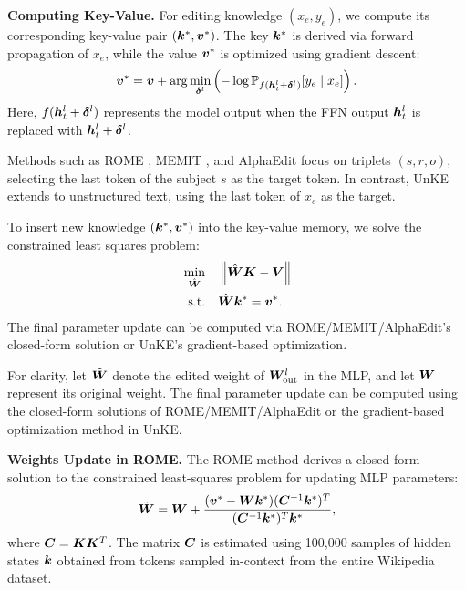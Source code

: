 \textbf{Computing Key-Value.} For editing knowledge $(x_e, y_e)$, we compute its corresponding key-value pair $({\bm{k}}^*, {\bm{v}}^*)$. The key ${\bm{k}}^*$ is derived via forward propagation of $x_e$, while the value ${\bm{v}}^*$ is optimized using gradient descent:
\begin{equation}
    {\bm{v}}^* = {\bm{v}} + \arg \min_{\bm{\delta}^l} \left( -\log \mathbb{P}_{f({\bm{h}}_t^l + \bm{\delta}^l)} [y_e \mid x_e] \right).
\end{equation}
Here, $f({\bm{h}}_t^l + \bm{\delta}^l)$ represents the model output when the FFN output ${\bm{h}}_t^l$ is replaced with ${\bm{h}}_t^l + \bm{\delta}^l$. 

Methods such as ROME \cite{ROME}, MEMIT \cite{MEMIT}, and AlphaEdit \cite{AlphaEdit} focus on triplets $(s, r, o)$, selecting the last token of the subject $s$ as the target token. In contrast, UnKE \cite{UnKE} extends to unstructured text, using the last token of $x_e$ as the target.

To insert new knowledge $({\bm{k}}^*, {\bm{v}}^*)$ into the key-value memory, we solve the constrained least squares problem:
\begin{align*}
    \min_{\hat{{\bm{W}}}} &\quad \left\lVert \hat{{\bm{W}}}{\bm{K}} - {\bm{V}} \right\rVert \\
    \text{s.t.} &\quad \hat{{\bm{W}}}{\bm{k}}^* = {\bm{v}}^*.
\end{align*}
The final parameter update can be computed via ROME/MEMIT/AlphaEdit's closed-form solution or UnKE's gradient-based optimization.

For clarity, let $\tilde{{\bm{W}}}$ denote the edited weight of ${\bm{W}}_{\text{out}}^l$ in the MLP, and let ${\bm{W}}$ represent its original weight. The final parameter update can be computed using the closed-form solutions of ROME/MEMIT/AlphaEdit or the gradient-based optimization method in UnKE.

\textbf{Weights Update in ROME.} The ROME method derives a closed-form solution to the constrained least-squares problem for updating MLP parameters:
\begin{equation}
    \tilde{{\bm{W}}} = {\bm{W}} + \frac{({\bm{v}}^\ast - {\bm{W}}{\bm{k}}^\ast) ({\bm{C}}^{-1} {\bm{k}}^\ast) ^ {T}}{({\bm{C}}^{-1} {\bm{k}}^\ast) ^ {T} {\bm{k}}^\ast},
\end{equation}
where ${\bm{C}} = {\bm{K}} {\bm{K}}^T$. The matrix ${\bm{C}}$ is estimated using 100,000 samples of hidden states ${\bm{k}}$ obtained from tokens sampled in-context from the entire Wikipedia dataset.

